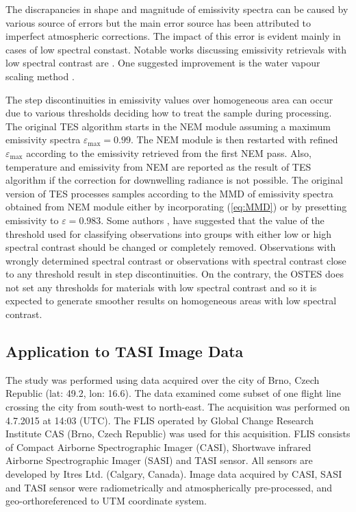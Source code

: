 The discrapancies in shape and magnitude of emissivity spectra can be caused by various source of errors but the main error source has been attributed to imperfect atmospheric corrections. The impact of this error is evident mainly in cases of low spectral constast. Notable works discussing emissivity retrievals with low spectral contrast are \cite{TP01, TP05, TP05-2, CC07, SJ07}. One suggested improvement is the water vapour scaling method \cite{T05, GA11}.

The step discontinuities in emissivity values over homogeneous area can occur due to various thresholds deciding how to treat the sample during processing. The original TES algorithm starts in the NEM module assuming a maximum emissivity spectra $\varepsilon_\mathrm{max}=0.99$. The NEM module is then restarted with refined $\varepsilon_\mathrm{max}$ according to the emissivity retrieved from the first NEM pass. Also,	 temperature and emissivity from NEM are reported as the result of TES algorithm if the correction for downwelling radiance is not possible. The original version of TES processes samples according to the MMD of emissivity spectra obtained from NEM module either by incorporating (\ref{eq:MMD}) or by presetting emissivity to $\varepsilon = 0.983$. Some authors \cite{GG06}, \cite{SG09} have suggested that the value of the threshold used for classifying observations into groups with either low or high spectral contrast should be changed or completely removed. Observations with wrongly determined spectral contrast or observations with spectral contrast close to any threshold result in step discontinuities. On the contrary, the OSTES does not set any thresholds for materials with low spectral contrast and so it is expected to generate smoother results on homogeneous areas with low spectral contrast.

\subsection*{Application to TASI Image Data}

The study was performed using data acquired over the city of Brno, Czech Republic (lat: 49.2, lon: 16.6). The data examined come subset of one flight line crossing the city from south-west to north-east. The acquisition was performed on 4.7.2015 at 14:03 (UTC). The FLIS operated by Global Change Research Institute CAS (Brno, Czech Republic) \cite{HF14} was used for this acquisition. FLIS consists of Compact Airborne Spectrographic Imager (CASI), Shortwave infrared Airborne Spectrographic Imager (SASI) and TASI sensor. All sensors are developed by Itres Ltd. (Calgary, Canada). Image data acquired by CASI, SASI and TASI sensor were radiometrically and atmospherically pre-processed, and geo-orthoreferenced to UTM coordinate system. 

